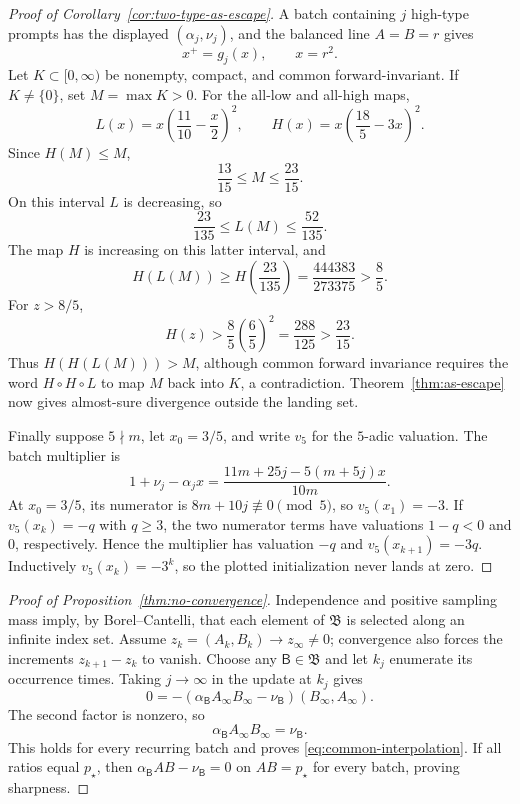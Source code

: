 \documentclass[11pt]{article}
\begin{document}
\begin{proof}[Proof of Corollary~\ref{cor:two-type-as-escape}]
A batch containing \(j\) high-type prompts has the displayed
\((\alpha_j,\nu_j)\), and the balanced line \(A=B=r\) gives
\[
    x^+=g_j(x),\qquad x=r^2.
\]
Let \(K\subset[0,\infty)\) be nonempty, compact, and common
forward-invariant.  If \(K\ne\{0\}\), set \(M=\max K>0\).  For the all-low
and all-high maps,
\[
L(x)=x\left(\frac{11}{10}-\frac{x}{2}\right)^2,\qquad
H(x)=x\left(\frac{18}{5}-3x\right)^2.
\]
Since \(H(M)\le M\),
\[
    \frac{13}{15}\le M\le\frac{23}{15}.
\]
On this interval \(L\) is decreasing, so
\[
    \frac{23}{135}\le L(M)\le\frac{52}{135}.
\]
The map \(H\) is increasing on this latter interval, and
\[
H(L(M))
\ge H\left(\frac{23}{135}\right)
=\frac{444383}{273375}>\frac85.
\]
For \(z>8/5\),
\[
H(z)>\frac85\left(\frac65\right)^2
=\frac{288}{125}>\frac{23}{15}.
\]
Thus \(H(H(L(M)))>M\), although common forward invariance requires the word
\(H\circ H\circ L\) to map \(M\) back into \(K\), a contradiction.
Theorem~\ref{thm:as-escape} now gives almost-sure divergence outside the
landing set.

Finally suppose \(5\nmid m\), let \(x_0=3/5\), and write \(v_5\) for the
\(5\)-adic valuation.  The batch multiplier is
\[
1+\nu_j-\alpha_jx
=\frac{11m+25j-5(m+5j)x}{10m}.
\]
At \(x_0=3/5\), its numerator is \(8m+10j\not\equiv0\pmod5\), so
\(v_5(x_1)=-3\).  If \(v_5(x_k)=-q\) with \(q\ge3\), the two numerator
terms have valuations \(1-q<0\) and \(0\), respectively.  Hence the
multiplier has valuation \(-q\) and
\(v_5(x_{k+1})=-3q\).  Inductively \(v_5(x_k)=-3^k\), so the plotted
initialization never lands at zero.
\end{proof}

\begin{proof}[Proof of Proposition~\ref{thm:no-convergence}]
Independence and positive sampling mass imply, by Borel--Cantelli, that each
element of \(\mathfrak B\) is selected along an infinite index set.  Assume
\(z_k=(A_k,B_k)\to z_\infty\ne0\); convergence also forces the increments
\(z_{k+1}-z_k\) to vanish.  Choose any \(\mathsf B\in\mathfrak B\) and let
\(k_j\) enumerate its occurrence times.  Taking \(j\to\infty\) in the update
at \(k_j\) gives
\[
0
=-(\alpha_{\mathsf B}A_\infty B_\infty-\nu_{\mathsf B})
  (B_\infty,A_\infty).
\]
The second factor is nonzero, so
\[
\alpha_{\mathsf B}A_\infty B_\infty=\nu_{\mathsf B}.
\]
This holds for every recurring batch and proves
\eqref{eq:common-interpolation}.  If all ratios equal \(p_\star\), then
\(\alpha_{\mathsf B}AB-\nu_{\mathsf B}=0\) on \(AB=p_\star\) for every
batch, proving sharpness.
\end{proof}
\end{document}
